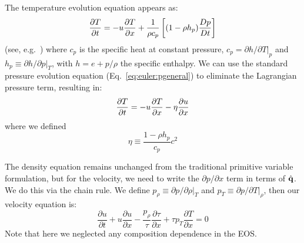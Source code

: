 The temperature evolution equation appears as:
\begin{equation}
\frac{\partial T}{\partial t} = -u{\frac{{\partial T}}{\partial x}} +
  \frac{1}{\rho c_p} \left [ (1 - \rho h_p) \frac{Dp}{Dt} \right ]
\end{equation}
(see, e.g.\ \cite{ABRZ:I}) where $c_p$ is the specific heat at
constant pressure, $c_p = \partial h/\partial T|_p$ and $h_p \equiv
\partial h / \partial p |_T$, with $h = e + p/\rho$ the specific
enthalpy.  We can use the standard pressure evolution equation
(Eq.~\ref{eq:euler:pgeneral}) to eliminate the Lagrangian pressure term,
resulting in:
\begin{equation}
\frac{\partial T}{\partial t} = -u{\frac{{\partial T}}{\partial x}} - \eta {\frac{{\partial u}}{\partial x}}
\end{equation}
where we defined
\begin{equation}
\eta \equiv \frac{1 - \rho h_p}{c_p} c^2
\end{equation}

The density equation remains unchanged from the traditional primitive
variable formulation, but for the velocity, we need to write the
$\partial p/\partial x$ term in terms of $\hat{{\bf q}}$.  We do this via
the chain rule.  We define $p_\rho \equiv {\partial p}/{\partial \rho}
|_T$ and $p_T \equiv {\partial p}/{\partial T} |_\rho$, then our
velocity equation is:
\begin{equation}
\frac{\partial u}{\partial t} + u \frac{\partial u}{\partial x} - \frac{p_\rho}{\tau} \frac{\partial \tau}{\partial x} + {\tau p_T} \frac{\partial T}{\partial x} = 0
\end{equation}
Note that here we neglected any composition dependence in the EOS.

